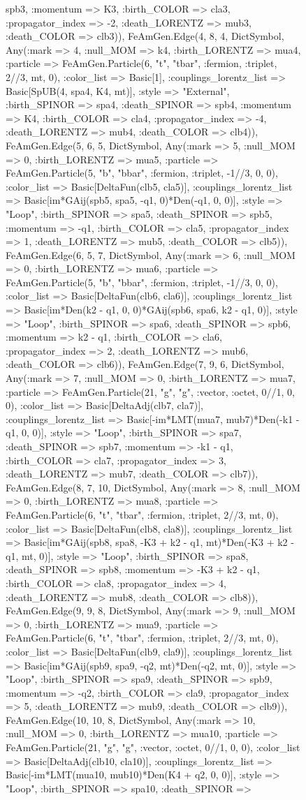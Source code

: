 \documentclass{revtex4}
\begin{document}
\begin{figure}[!htb]
\begin{center}
{spb3, :momentum => K3, :birth_COLOR => cla3, :propagator_index => -2, :death_LORENTZ => mub3, :death_COLOR => clb3)), FeAmGen.Edge(4, 8, 4, Dict{Symbol, Any}(:mark => 4, :null_MOM => k4, :birth_LORENTZ => mua4, :particle => FeAmGen.Particle(6, "t", "tbar", :fermion, :triplet, 2//3, mt, 0), :color_list => Basic[1], :couplings_lorentz_list => Basic[SpUB(4, spa4, K4, mt)], :style => "External", :birth_SPINOR => spa4, :death_SPINOR => spb4, :momentum => K4, :birth_COLOR => cla4, :propagator_index => -4, :death_LORENTZ => mub4, :death_COLOR => clb4)), FeAmGen.Edge(5, 6, 5, Dict{Symbol, Any}(:mark => 5, :null_MOM => 0, :birth_LORENTZ => mua5, :particle => FeAmGen.Particle(5, "b", "bbar", :fermion, :triplet, -1//3, 0, 0), :color_list => Basic[DeltaFun(clb5, cla5)], :couplings_lorentz_list => Basic[im*GAij(spb5, spa5, -q1, 0)*Den(-q1, 0, 0)], :style => "Loop", :birth_SPINOR => spa5, :death_SPINOR => spb5, :momentum => -q1, :birth_COLOR => cla5, :propagator_index => 1, :death_LORENTZ => mub5, :death_COLOR => clb5)), FeAmGen.Edge(6, 5, 7, Dict{Symbol, Any}(:mark => 6, :null_MOM => 0, :birth_LORENTZ => mua6, :particle => FeAmGen.Particle(5, "b", "bbar", :fermion, :triplet, -1//3, 0, 0), :color_list => Basic[DeltaFun(clb6, cla6)], :couplings_lorentz_list => Basic[im*Den(k2 - q1, 0, 0)*GAij(spb6, spa6, k2 - q1, 0)], :style => "Loop", :birth_SPINOR => spa6, :death_SPINOR => spb6, :momentum => k2 - q1, :birth_COLOR => cla6, :propagator_index => 2, :death_LORENTZ => mub6, :death_COLOR => clb6)), FeAmGen.Edge(7, 9, 6, Dict{Symbol, Any}(:mark => 7, :null_MOM => 0, :birth_LORENTZ => mua7, :particle => FeAmGen.Particle(21, "g", "g", :vector, :octet, 0//1, 0, 0), :color_list => Basic[DeltaAdj(clb7, cla7)], :couplings_lorentz_list => Basic[-im*LMT(mua7, mub7)*Den(-k1 - q1, 0, 0)], :style => "Loop", :birth_SPINOR => spa7, :death_SPINOR => spb7, :momentum => -k1 - q1, :birth_COLOR => cla7, :propagator_index => 3, :death_LORENTZ => mub7, :death_COLOR => clb7)), FeAmGen.Edge(8, 7, 10, Dict{Symbol, Any}(:mark => 8, :null_MOM => 0, :birth_LORENTZ => mua8, :particle => FeAmGen.Particle(6, "t", "tbar", :fermion, :triplet, 2//3, mt, 0), :color_list => Basic[DeltaFun(clb8, cla8)], :couplings_lorentz_list => Basic[im*GAij(spb8, spa8, -K3 + k2 - q1, mt)*Den(-K3 + k2 - q1, mt, 0)], :style => "Loop", :birth_SPINOR => spa8, :death_SPINOR => spb8, :momentum => -K3 + k2 - q1, :birth_COLOR => cla8, :propagator_index => 4, :death_LORENTZ => mub8, :death_COLOR => clb8)), FeAmGen.Edge(9, 9, 8, Dict{Symbol, Any}(:mark => 9, :null_MOM => 0, :birth_LORENTZ => mua9, :particle => FeAmGen.Particle(6, "t", "tbar", :fermion, :triplet, 2//3, mt, 0), :color_list => Basic[DeltaFun(clb9, cla9)], :couplings_lorentz_list => Basic[im*GAij(spb9, spa9, -q2, mt)*Den(-q2, mt, 0)], :style => "Loop", :birth_SPINOR => spa9, :death_SPINOR => spb9, :momentum => -q2, :birth_COLOR => cla9, :propagator_index => 5, :death_LORENTZ => mub9, :death_COLOR => clb9)), FeAmGen.Edge(10, 10, 8, Dict{Symbol, Any}(:mark => 10, :null_MOM => 0, :birth_LORENTZ => mua10, :particle => FeAmGen.Particle(21, "g", "g", :vector, :octet, 0//1, 0, 0), :color_list => Basic[DeltaAdj(clb10, cla10)], :couplings_lorentz_list => Basic[-im*LMT(mua10, mub10)*Den(K4 + q2, 0, 0)], :style => "Loop", :birth_SPINOR => spa10, :death_SPINOR => }
\end{center}
\end{figure}
\end{document}
